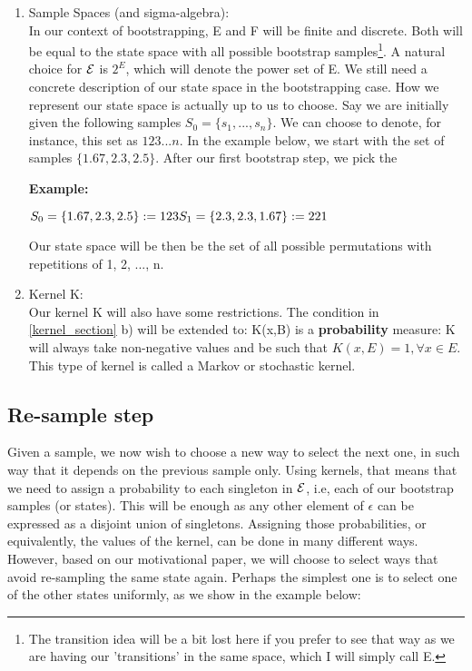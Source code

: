 \begin{enumerate}

\item Sample Spaces (and sigma-algebra): \\
In our context of bootstrapping, E and F will be finite and discrete. Both will be equal to the state space with all possible bootstrap samples\footnote{The transition idea will be a bit lost here if you prefer to see that way as we are having our 'transitions' in the same space, which I will simply call E.}. A natural choice for $\mathcal{E}$ is $2^E$, which will denote the power set of E. We still need a concrete description of our state space in the bootstrapping case. How we represent our state space is actually up to us to choose. Say we are initially given the following samples $S_0 = \{s_1, ..., s_n\}$. We can choose to denote, for instance, this set as $123...n$. In the example below, we start with the set of samples $\{1.67, 2.3, 2.5\}$. After our first bootstrap step, we pick the 

\textbf{Example:}

$
S_0 = \{1.67, 2.3, 2.5\} := 123 \\
S_1 = \{2.3, 2.3, 1.67\} := 221
$

Our state space will be then be the set of all possible permutations with repetitions of 1, 2, ..., n.

\item Kernel K: \\ 
Our kernel K will also have some restrictions. The condition in \ref{kernel_section} b) will be extended to:  K(x,B) is a \textbf{probability} measure: K will always take non-negative values and be such that $K(x,E) = 1, \forall x \in E.$ This type of kernel is called a Markov or stochastic kernel.

\end{enumerate}



\subsection{Re-sample step}

Given a sample, we now wish to choose a new way to select the next one, in such way that it depends on the previous sample only. Using kernels, that means that we need to assign a probability to each singleton in $\mathcal{E}$, i.e, each of our bootstrap samples (or states). This will be enough as any other element of $\epsilon$ can be expressed as a disjoint union of singletons. Assigning those probabilities, or equivalently, the values of the kernel, can be done in many different ways. However, based on our motivational paper, we will choose to select ways that avoid re-sampling the same state again. Perhaps the simplest one is to select one of the other states uniformly, as we show in the example below:

